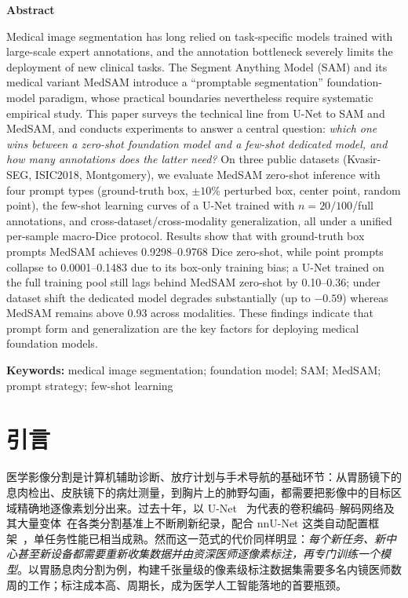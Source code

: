 \documentclass[zihao=-4,a4paper]{ctexart}
\begin{document}
\vspace{1.2em}
\begin{center}
{\bfseries Abstract}
\end{center}

Medical image segmentation has long relied on task-specific models trained with large-scale expert annotations, and the annotation bottleneck severely limits the deployment of new clinical tasks. The Segment Anything Model (SAM) and its medical variant MedSAM introduce a ``promptable segmentation'' foundation-model paradigm, whose practical boundaries nevertheless require systematic empirical study. This paper surveys the technical line from U-Net to SAM and MedSAM, and conducts experiments to answer a central question: \emph{which one wins between a zero-shot foundation model and a few-shot dedicated model, and how many annotations does the latter need?} On three public datasets (Kvasir-SEG, ISIC2018, Montgomery), we evaluate MedSAM zero-shot inference with four prompt types (ground-truth box, $\pm10\%$ perturbed box, center point, random point), the few-shot learning curves of a U-Net trained with $n=20/100$/full annotations, and cross-dataset/cross-modality generalization, all under a unified per-sample macro-Dice protocol. Results show that with ground-truth box prompts MedSAM achieves 0.9298--0.9768 Dice zero-shot, while point prompts collapse to 0.0001--0.1483 due to its box-only training bias; a U-Net trained on the full training pool still lags behind MedSAM zero-shot by 0.10--0.36; under dataset shift the dedicated model degrades substantially (up to $-0.59$) whereas MedSAM remains above 0.93 across modalities. These findings indicate that prompt form and generalization are the key factors for deploying medical foundation models.

\vspace{0.8em}
\noindent\textbf{Keywords:} medical image segmentation; foundation model; SAM; MedSAM; prompt strategy; few-shot learning

\section{引言}

医学影像分割是计算机辅助诊断、放疗计划与手术导航的基础环节：从胃肠镜下的息肉检出、皮肤镜下的病灶测量，到胸片上的肺野勾画，都需要把影像中的目标区域精确地逐像素划分出来。过去十年，以 U-Net~\cite{ronneberger2015unet} 为代表的卷积编码--解码网络及其大量变体~\cite{long2015fcn,cicek2016unet3d,zhou2018unetpp,chen2021transunet,cao2022swinunet}在各类分割基准上不断刷新纪录，配合 nnU-Net 这类自动配置框架~\cite{isensee2021nnunet}，单任务性能已相当成熟。然而这一范式的代价同样明显：\emph{每个新任务、新中心甚至新设备都需要重新收集数据并由资深医师逐像素标注，再专门训练一个模型}。以胃肠息肉分割为例，构建千张量级的像素级标注数据集需要多名内镜医师数周的工作；标注成本高、周期长，成为医学人工智能落地的首要瓶颈。
\end{document}

